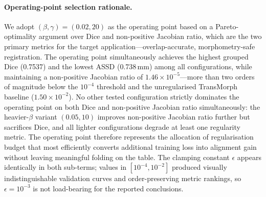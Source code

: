 \documentclass[jimaging,article,submit,pdftex,moreauthors]{Definitions/mdpi}
\begin{document}
\paragraph{Operating-point selection rationale.}
We adopt \((\beta,\gamma)=(0.02,20)\) as the operating point based on a Pareto-optimality argument over Dice and non-positive Jacobian ratio, which are the two primary metrics for the target application---overlap-accurate, morphometry-safe registration.
The operating point simultaneously achieves the highest grouped Dice (0.7537) and the lowest ASSD (0.738\,mm) among all configurations, while maintaining a non-positive Jacobian ratio of \(1.46\times10^{-5}\)---more than two orders of magnitude below the \(10^{-4}\) threshold and the unregularised TransMorph baseline (\(1.50\times10^{-2}\)).
No other tested configuration strictly dominates the operating point on both Dice and non-positive Jacobian ratio simultaneously: the heavier-\(\beta\) variant \((0.05,10)\) improves non-positive Jacobian ratio further but sacrifices Dice, and all lighter configurations degrade at least one regularity metric.
The operating point therefore represents the allocation of regularisation budget that most efficiently converts additional training loss into alignment gain without leaving meaningful folding on the table.
The clamping constant \(\epsilon\) appears identically in both sub-terms; values in \([10^{-4},10^{-2}]\) produced visually indistinguishable validation curves and order-preserving metric rankings, so \(\epsilon=10^{-3}\) is not load-bearing for the reported conclusions.
\end{document}
